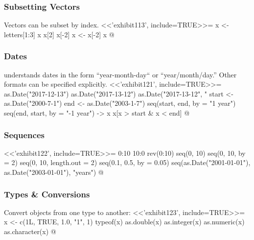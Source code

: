 \begin{frame}[fragile]%
\frametitle{Subsetting Vectors}
Vectors can be subset by index.
<<'exhibit113', include=TRUE>>=
  x <- letters[1:3]
  x
  x[2]
  x[-2]
  x <- x[-2]
  x
@
\end{frame}




\begin{frame}[fragile]%
\frametitle{Dates}
\Rlogo understands dates in the form ``year-month-day`` or ``year/month/day.'' Other formats can be specified explicitly. 
<<'exhibit121', include=TRUE>>=
  as.Date("2017-12-13")
  as.Date("2017-13-12")  
  as.Date("2017-13-12", "%
  start <- as.Date("2000-7-1")
  end <- as.Date("2003-1-7")
  seq(start, end, by = "1 year")
  seq(end, start, by = "-1 year") -> x
  x[x > start & x < end]
@
\end{frame}


\begin{frame}[fragile]%
\frametitle{Sequences}
<<'exhibit122', include=TRUE>>=
  0:10
  10:0
  rev(0:10)
  seq(0, 10)
  seq(0, 10, by = 2)
  seq(0, 10, length.out = 2)
  seq(0.1, 0.5, by = 0.05)
  seq(as.Date("2001-01-01"), as.Date("2003-01-01"), "years")
@
\end{frame}


\begin{frame}[fragile]%
\frametitle{Types \& Conversions}
Convert objects from one type to another:
<<'exhibit123', include=TRUE>>=
  x <- c(1L, TRUE, 1.0, "1", 1)
  typeof(x)
  as.double(x)
  as.integer(x)
  as.numeric(x)
  as.character(x)
@
\end{frame}


